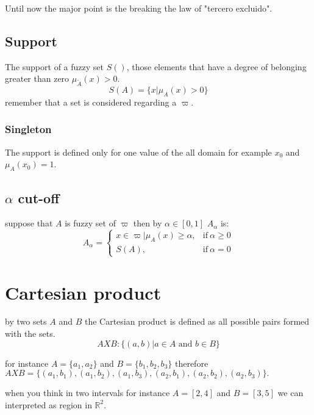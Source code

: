\documentclass[10pt,a4paper]{article}
\begin{document}
Until now the major point is the breaking the law of "tercero excluido".

\subsection{Support}

The support of a fuzzy set $S()$, those elements that have a degree of belonging greater than zero  $\mu_{\tilde{A}}(x)>0$.
\begin{equation}
S(A) = \{ x  | \mu_{A}(x) >  0 \} 
\end{equation}
remember that a set is considered regarding a $\varpi$.



\subsubsection{Singleton}
The support is defined only for one value of the all domain for example $x_{0}$ and $\mu_{A}(x_{0})=1$.


\subsection{$\alpha$ cut-off}
suppose that $A$ is fuzzy set of $\varpi$ then by $\alpha \in [0,1]$ $A_{\alpha}$ is:
\begin{equation}
 A_{\alpha}= \begin{cases}
      x \in \varpi | \mu_{A}(x) \geq \alpha, & \text{if}\ \alpha \geq 0 \\
      S(A), & \text{if}\ \alpha = 0
    \end{cases}
\end{equation}






\section{Cartesian product}
by two sets $A$ and $B$ the Cartesian product is
defined as all possible pairs formed with the sets.
\begin{equation}
A X B : \{(a,b) | a \in A \text{ and } b \in B\}
\end{equation}

for instance $A = \{a_{1}, a_{2}  \}$ and $ B =\{b_{1},b_{2},b_{3}\}$ therefore
$A X B = \{(a_{1}, b_{1}), (a_{1},b_{2}), (a_{1},b_{3}), (a_{2},b_{1}), (a_{2},b_{2}), (a_{2},b_{3})\}.$


when you think in two intervals for instance $ A = [2,4]$ and $B=[3,5]$ we can interpreted as  region in $\mathbb{R}^{2}$.
\end{document}
